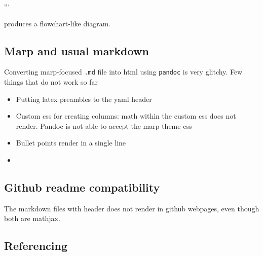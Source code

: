 \documentclass[
]{article}
\providecommand{\tightlist}{%
  \setlength{\itemsep}{0pt}\setlength{\parskip}{0pt}}
\begin{document}
```

produces a flowchart-like diagram.

\hypertarget{marp-and-usual-markdown}{%
\subsection{Marp and usual markdown}\label{marp-and-usual-markdown}}

Converting marp-focused \texttt{.md} file into html using
\texttt{pandoc} is very glitchy. Few things that do not work so far

\begin{itemize}
\tightlist
\item
  Putting latex preambles to the yaml header
\item
  Custom css for creating columns: math within the custom css does not
  render. Pandoc is not able to accept the marp theme css
\item
  Bullet points render in a single line
\item
\end{itemize}

\hypertarget{github-readme-compatibility}{%
\subsection{Github readme
compatibility}\label{github-readme-compatibility}}

The markdown files with header does not render in github webpages, even
though both are mathjax.

\hypertarget{referencing}{%
\subsection{Referencing}\label{referencing}}
\end{document}
